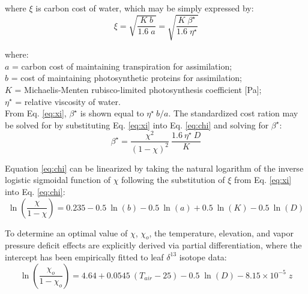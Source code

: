 \noindent where $\xi$ is carbon cost of water, which may be simply expressed by:
%
\begin{equation}
\label{eq:xi}
    \xi = \sqrt{\frac{K\; b}{1.6\; a}} = \sqrt{\frac{K\; \beta^\star}{1.6\; \eta^\star}}
\end{equation}

\noindent where:\\
\indent $a$ = carbon cost of maintaining transpiration for assimilation; \\
\indent $b$ = cost of maintaining photosynthetic proteins for assimilation;\\
\indent $K$ = Michaelis-Menten rubisco-limited photosynthesis coefficient [Pa];\\
\indent $\eta^\star$ = relative viscosity of water.\\

\noindent From Eq. \ref{eq:xi}, $\beta^\star$ is shown equal to $\eta^\star\: b/a$.
The standardized cost ration may be solved for by substituting Eq. \ref{eq:xi} into Eq. \ref{eq:chi} and solving for $\beta^\star$:
\begin{equation}
\label{eq:bstar}
    \beta^\star = \frac{\chi^2}{\left(1 - \chi \right)^2}\: \frac{1.6\: \eta^\star\: D}{K}
\end{equation}

Equation \ref{eq:chi} can be linearized by taking the natural logarithm of the inverse logistic sigmoidal function of $\chi$ following the substitution of $\xi$ from Eq. \ref{eq:xi} into Eq. \ref{eq:chi}:
\begin{equation}
\label{eq:logit}
    \ln \left( \frac{\chi}{1 - \chi} \right) = 
    	0.235 - 0.5\:\ln(b) - 0.5\:\ln(a) + 0.5\:\ln(K) - 0.5\:\ln(D)
\end{equation}

\noindent To determine an optimal value of $\chi$, $\chi_o$, the temperature, elevation, and vapor pressure deficit effects are explicitly derived via partial differentiation, where the intercept has been empirically fitted to leaf $\delta^{13}$ isotope data:
\begin{equation}
\label{eq:whe}
    \ln \left(\frac{\chi_o}{1 - \chi_o}\right) = 4.64 + 
    	0.0545\: \left(T_{air} - 25\right) - 
    	0.5\; \ln (D) - 
    	8.15\times 10^{-5}\; z
\end{equation}

